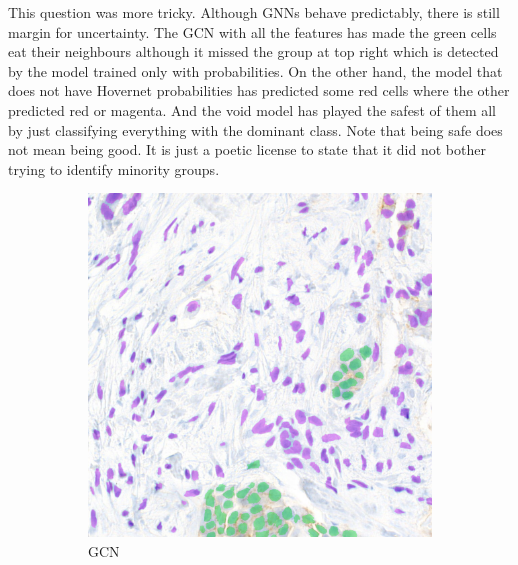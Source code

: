 This question was more tricky. Although GNNs behave predictably, there is still margin for uncertainty. The GCN with all the features has made the green cells eat their neighbours although it missed the group at top right which is detected by the model trained only with probabilities. On the other hand, the model that does not have Hovernet probabilities has predicted some red cells where the other predicted red or magenta. And the void model has played the safest of them all by just classifying everything with the dominant class. Note that being safe does not mean being good. It is just a poetic license to state that it did not bother trying to identify minority groups.

\begin{figure}[H]
  \centering
  \begin{subfigure}[b]{0.45\textwidth}
    \includegraphics[width=\textwidth]{imgs/qual/breast/gcn-full1.png}
    \caption{GCN}
    \label{fig:breast-gt1}
  \end{subfigure}
  \hfill
  \begin{subfigure}[b]{0.45\textwidth}

\end{subfigure}
\end{figure}
